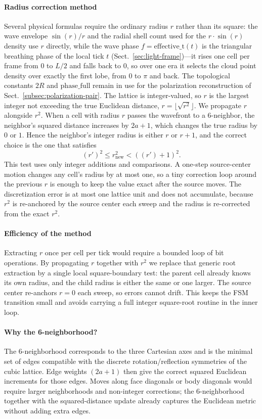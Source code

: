 \documentclass[a4paper]{article}
\begin{document}
\paragraph{Radius correction method}
Several physical formulas require the ordinary radius $r$ rather than its square:
the wave envelope $\sin(r)/r$
and the radial shell count used for the $r\cdot\sin(r)$ density use $r$ directly,
while the wave phase $f=\mathrm{effective\_t}(t)$ is the triangular breathing phase of the local tick $t$ (Sect.~\ref{sec:light-frame})---it rises one cell per frame from $0$ to $L/2$ and falls back to $0$, so over one era it selects the cloud point density over exactly the first lobe, from $0$ to $\pi$ and back.
The topological constants $2R$ and $\mathrm{phase\_full}$ remain in use for the polarization reconstruction of Sect.~\ref{subsec:polarization-pair}.
The lattice is integer-valued, so $r$ is the largest integer not exceeding the true Euclidean distance,
$r=\lfloor\sqrt{r^{2}}\rfloor$.
We propagate $r$ alongside $r^{2}$.
When a cell with radius $r$ passes the wavefront to a 6-neighbor,
the neighbor's squared distance increases by $2a+1$,
which changes the true radius by $0$ or $1$.
Hence the neighbor's integer radius is either $r$ or $r+1$,
and the correct choice is the one that satisfies
\[
(r')^{2}\le r^{2}_{\text{new}}<((r')+1)^{2}.
\]
This test uses only integer additions and comparisons.
A one-step source-center motion changes any cell's radius by at most one,
so a tiny correction loop around the previous $r$ is enough to keep the value exact after the source moves.
The discretization error is at most one lattice unit and does not accumulate,
because $r^{2}$ is re-anchored by the source center each sweep
and the radius is re-corrected from the exact $r^{2}$.
\paragraph{Efficiency of the method}
Extracting $r$ once per cell per tick would require a bounded loop of bit operations.
By propagating $r$ together with $r^{2}$ we replace that generic root extraction
by a single local square-boundary test: the parent cell already knows its own radius,
and the child radius is either the same or one larger.
The source center re-anchors $r=0$ each sweep, so errors cannot drift.
This keeps the FSM transition small and avoids carrying a full integer square-root routine in the inner loop.
\paragraph{Why the 6-neighborhood?}
The 6-neighborhood corresponds to the three Cartesian axes and is the minimal set of edges compatible with the discrete rotation/reflection symmetries of the cubic lattice.  Edge weights $(2a+1)$ then give the correct squared Euclidean increments for those edges.  Moves along face diagonals or body diagonals would require larger neighborhoods and non-integer corrections; the 6-neighborhood together with the squared-distance update already captures the Euclidean metric without adding extra edges.
\end{document}

